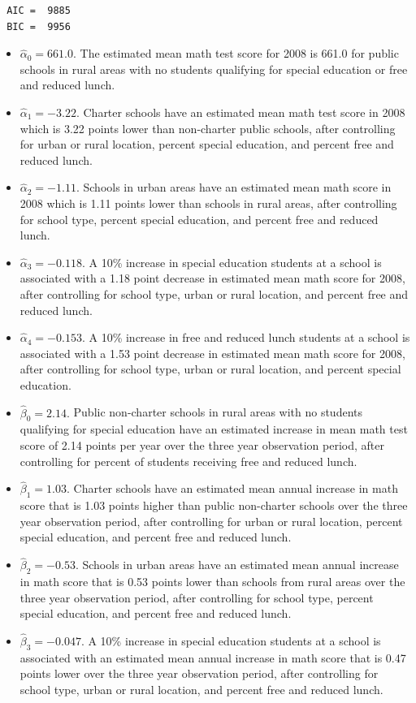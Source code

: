 \documentclass[
]{krantz}
\providecommand{\tightlist}{%
  \setlength{\itemsep}{0pt}\setlength{\parskip}{0pt}}
\begin{document}
\begin{verbatim}
 AIC =  9885 
 BIC =  9956 
\end{verbatim}

\begin{itemize}
\tightlist
\item
  \(\hat{\alpha}_{0}= 661.0.\) The estimated mean math test score for 2008 is 661.0 for public schools in rural areas with no students qualifying for special education or free and reduced lunch.
\item
  \(\hat{\alpha}_{1}= -3.22.\) Charter schools have an estimated mean math test score in 2008 which is 3.22 points lower than non-charter public schools, after controlling for urban or rural location, percent special education, and percent free and reduced lunch.
\item
  \(\hat{\alpha}_{2}= -1.11.\) Schools in urban areas have an estimated mean math score in 2008 which is 1.11 points lower than schools in rural areas, after controlling for school type, percent special education, and percent free and reduced lunch.
\item
  \(\hat{\alpha}_{3}= -0.118.\) A 10\% increase in special education students at a school is associated with a 1.18 point decrease in estimated mean math score for 2008, after controlling for school type, urban or rural location, and percent free and reduced lunch.
\item
  \(\hat{\alpha}_{4}= -0.153.\) A 10\% increase in free and reduced lunch students at a school is associated with a 1.53 point decrease in estimated mean math score for 2008, after controlling for school type, urban or rural location, and percent special education.
\item
  \(\hat{\beta}_{0}= 2.14.\) Public non-charter schools in rural areas with no students qualifying for special education have an estimated increase in mean math test score of 2.14 points per year over the three year observation period, after controlling for percent of students receiving free and reduced lunch.
\item
  \(\hat{\beta}_{1}= 1.03.\) Charter schools have an estimated mean annual increase in math score that is 1.03 points higher than public non-charter schools over the three year observation period, after controlling for urban or rural location, percent special education, and percent free and reduced lunch.
\item
  \(\hat{\beta}_{2}= -0.53.\) Schools in urban areas have an estimated mean annual increase in math score that is 0.53 points lower than schools from rural areas over the three year observation period, after controlling for school type, percent special education, and percent free and reduced lunch.
\item
  \(\hat{\beta}_{3}= -0.047.\) A 10\% increase in special education students at a school is associated with an estimated mean annual increase in math score that is 0.47 points lower over the three year observation period, after controlling for school type, urban or rural location, and percent free and reduced lunch.
\end{itemize}
\end{document}
